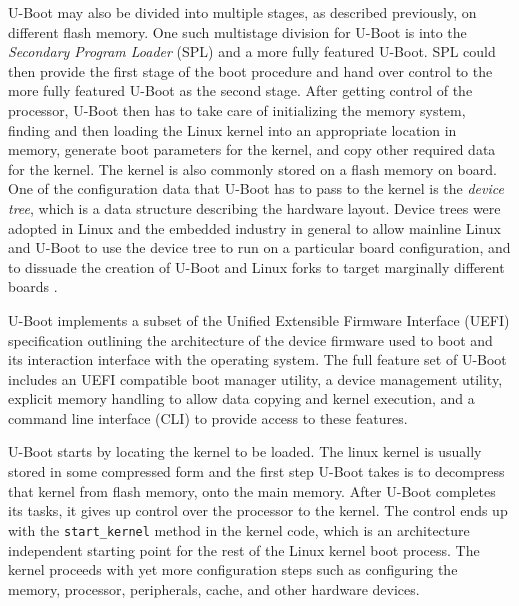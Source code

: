 U-Boot may also be divided into multiple stages, as described previously, on different flash memory. One such multistage division for U-Boot is into the \textit{Secondary Program Loader} (SPL) and a more fully featured U-Boot. SPL could then provide the first stage of the boot procedure and hand over control to the more fully featured U-Boot as the second stage. After getting control of the processor, U-Boot then has to take care of initializing the memory system, finding and then loading the Linux kernel into an appropriate location in memory, generate boot parameters for the kernel, and copy other required data for the kernel. The kernel is also commonly stored on a flash memory on board. One of the configuration data that U-Boot has to pass to the kernel is the \textit{device tree}, which is a data structure describing the hardware layout. Device trees were adopted in Linux and the embedded industry in general to allow mainline Linux and U-Boot to use the device tree to run on a particular board configuration, and to dissuade the creation of U-Boot and Linux forks to target marginally different boards \cite{device-tree}.

U-Boot implements a subset of the Unified Extensible Firmware Interface (UEFI) specification outlining the architecture of the device firmware used to boot and its interaction interface with the operating system. The full feature set of U-Boot includes an UEFI compatible boot manager utility, a device management utility, explicit memory handling to allow data copying and kernel execution, and a command line interface (CLI) to provide access to these features.

U-Boot starts by locating the kernel to be loaded. The linux kernel is usually stored in some compressed form and the first step U-Boot takes is to decompress that kernel from flash memory, onto the main memory. After U-Boot completes its tasks, it gives up control over the processor to the kernel. The control ends up with the \texttt{start\_kernel} method in the kernel code, which is an architecture independent starting point for the rest of the Linux kernel boot process. The kernel proceeds with yet more configuration steps such as configuring the memory, processor, peripherals, cache, and other hardware devices.

